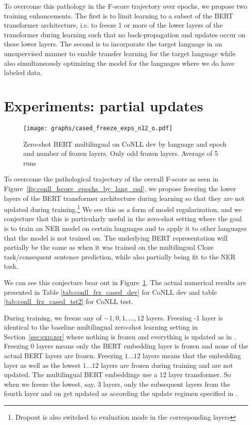\documentclass[letterpaper]{article} \usepackage{aaai20}  \usepackage{times}  \usepackage{helvet} \usepackage{courier}  \usepackage[hyphens]{url}  \usepackage{graphicx} \urlstyle{rm} \def\UrlFont{\rm}  \usepackage{graphicx}  \frenchspacing  \setlength{\pdfpagewidth}{8.5in}  \setlength{\pdfpageheight}{11in}  \usepackage{amsmath}
\begin{document}
To overcome this pathology in the F-score trajectory over epochs,
we propose two training enhancements. The first is to limit learning to a subset of the BERT transformer architecture, i.e. to freeze 1 or more of the lower layers of the transformer during learning such that no back-propagation and updates occur on these lower layers. The second is to incorporate the target language in an unsupervised manner to enable transfer learning for the target language while also simultaneously optimizing the model for the languages where we do have labeled data. \section{Experiments: partial updates}
\label{sec:exp:part-up}



\begin{figure}
\texttt{[image: graphs/cased\_freeze\_exps\_n12\_o.pdf]}
\caption{Zero-shot BERT multilingual on CoNLL dev by language and epoch and number
  of frozen layers. Only odd frozen layers. Average of 5 runs}
\label{fig:cased_freeze_exps_n12_o}
\end{figure}



To overcome the pathological trajectory of the overall F-score as seen in Figure~\ref{fig:conll_fscore_epochs_by_lang_csd}, we propose freezing the lower layers of the BERT transformer architecture during learning so that they are not updated during training.\footnote{Dropout is also switched to evaluation
mode in the corresponding layers} We see this as a form of model regularization, and we conjecture that this is particularly useful in the zero-shot setting where the goal is to train an NER model on certain languages and to apply it to other languages that the model is not trained on. The underlying BERT representation will partially be the same as when it was trained on the multilingual Cloze task/consequent sentence prediction, while also partially being fit to the NER task.

We can see this conjecture bear out in Figure~\ref{fig:cased_freeze_exps_n12_o}.
The actual numerical results are presented in
Table \ref{tab:conll_frz_cased_dev} for CoNLL dev and table
\ref{tab:conll_frz_cased_tst2} for CoNLL test. 

During training, we freeze any of $-1, 0, 1,\ldots,12$ layers. Freezing -1 layer is identical to the baseline multilingual zero-shot learning setting in Section~\ref{sec:exp:zer} where nothing is frozen and everything is updated as in \cite{BERT18}. Freezing 0 layers means only the BERT embedding layer is frozen and none of the actual BERT layers are frozen. Freezing $1\ldots 12$ layers means that the embedding layer as well as the lowest $1\ldots 12$ layers are frozen during training and are not updated. The multilingual BERT embeddings use a 12 layer transformer. So when we freeze the lowest, say, 3 layers, only the subsequent layers from the fourth layer and on get updated as according the update regimen specified in \cite{BERT18}.
\end{document}
